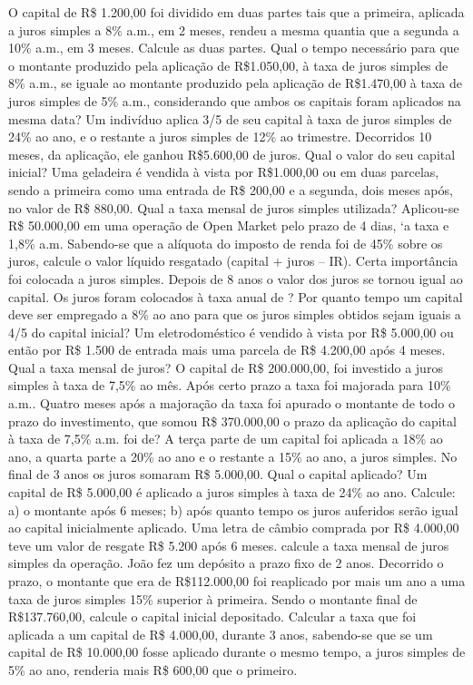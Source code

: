 \begin{exercicios}
    \exitem{} O capital de R\$ 1.200,00 foi dividido em duas partes tais que a primeira, aplicada a juros simples a 8\% a.m., em 2 meses, rendeu a mesma quantia que a segunda a 10\% a.m., em 3 meses. Calcule as duas partes. 
    \exitem{} Qual o tempo necessário para que o montante produzido pela aplicação de R\$1.050,00, à taxa de juros simples de 8\% a.m., se iguale ao montante produzido pela aplicação de R\$1.470,00 à taxa de juros simples de 5\% a.m., considerando que ambos os capitais foram aplicados na mesma data?
    \exitem{} Um indivíduo aplica 3/5 de seu capital à taxa de juros simples de 24\% ao ano, e o restante a juros simples de 12\% ao trimestre. Decorridos 10 meses, da aplicação, ele ganhou R\$5.600,00 de juros. Qual o valor do seu capital inicial? 		 
    \exitem{} Uma geladeira é vendida à vista por R\$1.000,00 ou em duas parcelas, sendo a primeira como uma entrada de  R\$ 200,00 e a segunda, dois meses após, no valor de R\$ 880,00. Qual a taxa  mensal de juros simples utilizada?	
    \exitem{} Aplicou-se R\$ 50.000,00 em uma operação de Open Market pelo prazo de 4 dias, `a taxa e 1,8\% a.m.  Sabendo-se que a alíquota do imposto de renda foi de 45\% sobre os juros, calcule o valor líquido resgatado (capital + juros – IR).	
    \exitem{} Certa importância foi colocada a juros simples. Depois de 8 anos o valor dos juros se tornou igual ao capital. Os juros foram colocados à taxa anual de ?		
    \exitem{} Por quanto tempo um capital deve ser empregado a 8\% ao ano para que os juros simples obtidos sejam iguais a 4/5 do capital inicial?
    \exitem{} Um eletrodoméstico é vendido à vista por R\$ 5.000,00 ou então por R\$ 1.500 de entrada mais uma parcela de R\$ 4.200,00 após 4 meses. Qual a taxa mensal de juros? 	
    \exitem{} O capital de R\$ 200.000,00, foi investido a juros simples à taxa de 7,5\% ao mês. Após certo prazo a taxa foi majorada para 10\% a.m.. Quatro meses após a majoração da taxa foi apurado o montante  de todo o prazo do investimento, que somou R\$ 370.000,00 o prazo da aplicação do capital à taxa de 7,5\% a.m. foi de?					
    \exitem{} A terça parte de um capital foi aplicada a 18\% ao ano, a quarta parte a 20\% ao ano e o restante a 15\% ao ano, a juros simples. No final de 3 anos os juros somaram R\$ 5.000,00. Qual o capital aplicado? 
    \exitem{} Um capital de R\$ 5.000,00 é aplicado a juros simples à taxa de 24\% ao ano. Calcule:
    a) o montante após 6 meses;
    b) após quanto tempo os juros auferidos serão igual ao capital inicialmente aplicado.
    \exitem{} Uma letra de câmbio comprada por R\$ 4.000,00 teve um valor de resgate R\$ 5.200 após 6 meses. calcule a taxa mensal de juros simples da operação. 	
    \exitem{} João fez um depósito a prazo fixo de 2 anos. Decorrido o prazo, o montante que era de R\$112.000,00 foi reaplicado por mais um ano a uma taxa de juros simples 15\% superior à primeira. Sendo o montante final de R\$137.760,00, calcule o capital inicial depositado. 
    \exitem{} Calcular a taxa que foi aplicada a um capital de R\$ 4.000,00, durante 3 anos, sabendo-se que se um capital de R\$ 10.000,00 fosse aplicado durante o mesmo tempo, a juros simples de 5\% ao ano, renderia mais R\$ 600,00 que o primeiro.		
\end{exercicios}

